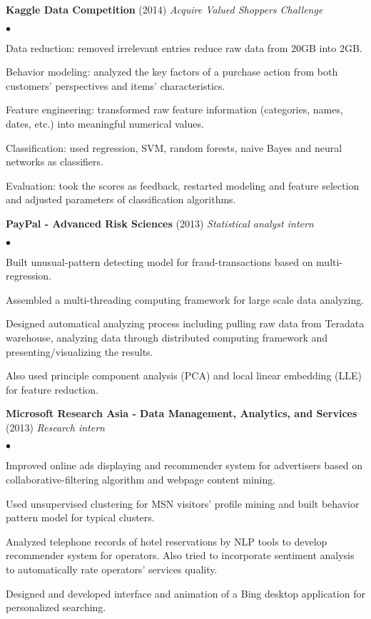\documentclass{article}
\newcommand{\employer}[3]{{ \textbf{#1} (#2) \hfill {\emph{#3}} \\  }}
\newenvironment{achievements}{\begin{list}{$\bullet$}{\topsep 0pt \itemsep -2pt}}{\vspace*{4pt}\end{list}}
\begin{document}
\employer{Kaggle Data Competition}{2014}{Acquire Valued Shoppers Challenge}
	\begin{achievements}
	\item Data reduction: removed irrelevant entries reduce raw data from 20GB into 2GB.
	\item Behavior modeling: analyzed the key factors of a purchase action from both customers' perspectives and items' characteristics.
	\item Feature engineering: transformed raw feature information (categories, names, dates, etc.) into meaningful numerical values.
	\item Classification: used regression, SVM, random forests, naive Bayes and neural networks as classifiers.
	\item Evaluation: took the scores as feedback, restarted modeling and feature selection and adjusted parameters of classification algorithms.
	\end{achievements}

\employer{PayPal - Advanced Risk Sciences}{2013}{Statistical analyst intern}
	\begin{achievements}
	\item Built unusual-pattern detecting model for fraud-transactions based on multi-regression. 
	\item Assembled a multi-threading computing framework for large scale data analyzing. 
	\item Designed automatical analyzing process including pulling raw data from Teradata warehouse, analyzing data through distributed computing framework and presenting/visualizing the results. 
	\item Also used principle component analysis (PCA) and local linear embedding (LLE) for feature reduction.
	\end{achievements}

\employer{Microsoft Research Asia - Data Management, Analytics, and Services}{2013}{Research intern}
	\begin{achievements}
	\item Improved online ads displaying and recommender system for advertisers based on collaborative-filtering algorithm and webpage content mining. 
	\item Used unsupervised clustering for MSN visitors' profile mining and built behavior pattern model for typical clusters. 
	\item Analyzed telephone records of hotel reservations by NLP tools to develop recommender system for operators. Also tried to incorporate sentiment analysis to automatically rate operators' services quality. 
	\item Designed and developed interface and animation of a \textsf{Bing} desktop application for personalized searching.
	\end{achievements}
\end{document}
